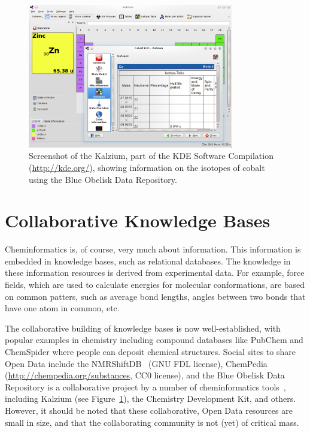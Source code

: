 \documentclass[12pt]{book}
\begin{document}
\begin{figure}[bt]
\begin{center}
\includegraphics[width=0.8\textwidth]{graphics/kalzium.png}
\end{center}
\caption{Screenshot of the Kalzium, part of the KDE Software
Compilation (\url{http://kde.org/}), showing information on the
isotopes of cobalt using the Blue Obelisk Data Repository.}
\label{fig:kalzium}
\end{figure}

\section{Collaborative Knowledge Bases}

Cheminformatics is, of course, very much about information. This
information is embedded in knowledge bases, such as relational databases.
The knowledge in these information resources is derived from experimental
data. For example, force fields, which are used to calculate energies
for molecular conformations, are based on common patters, such as
average bond lengths, angles between two bonds that have one
atom in common, etc.

The collaborative building of knowledge bases is now well-established,
with popular examples in chemistry including compound databases
like PubChem and ChemSpider where people can deposit chemical
structures.
Social sites to share Open Data include the
NMRShiftDB~\cite{Steinbeck2004} (GNU FDL license),
ChemPedia (\url{http://chempedia.org/substances}, CC0 license),
and the Blue Obelisk Data Repository is a collaborative project by a number
of cheminformatics tools~\cite{Guha2006}, including Kalzium (see Figure~\ref{fig:kalzium}),
the Chemistry Development Kit, and others.
However, it should be noted that these collaborative, Open Data
resources are small in size, and that the collaborating community
is not (yet) of critical mass.
\end{document}
